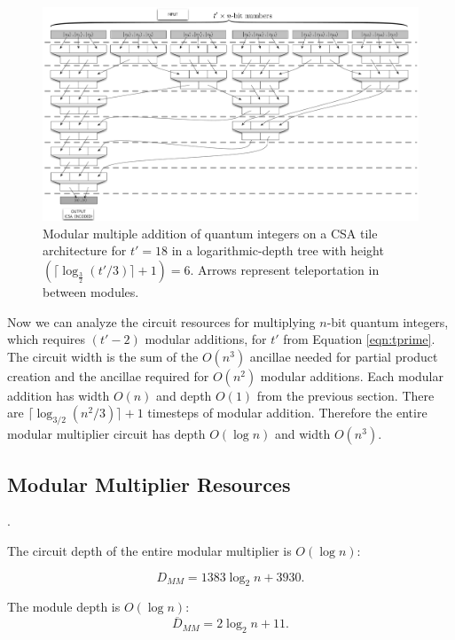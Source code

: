 \begin{figure}[htb!]
\centerline{
\includegraphics[width=5.5in]{factor-polylog/figures/mod-mult-add.pdf}
}
\caption{Modular multiple addition of quantum integers on a CSA tile
architecture for $t'=18$ in a logarithmic-depth tree with height $(\lceil \log_{\frac{3}{2}}(t'/3) \rceil + 1) = 6$. Arrows represent teleportation
in between modules.}
\label{fig:mod-mult}
\end{figure}
%

Now we can analyze the circuit resources for multiplying $n$-bit
quantum integers, which requires $(t'-2)$ modular additions, for $t'$ from
Equation \ref{eqn:tprime}.
The circuit width is the sum of the $O(n^3)$ ancillae
needed for partial product creation and the ancillae required for $O(n^2)$
modular additions. Each modular addition has width $O(n)$ and depth $O(1)$
from the previous
section. There are
$\lceil \log_{3/2}(n^2 / 3) \rceil +1 $ timesteps of modular addition. Therefore
the entire modular multiplier circuit has depth $O(\log n)$ and width $O(n^3)$.

\subsection{Modular Multiplier Resources}
\label{subsec:mod-mult-resources}.

The circuit depth of the entire modular multiplier is $O(\log n)$:

\begin{equation}
D_{MM} = 1383 \log_2 n + 3930\text{.}
\end{equation}

The module depth is $O(\log n)$:
\begin{equation}
\overline{D}_{MM} = 2\log_2 n + 11\text{.}
\end{equation}

